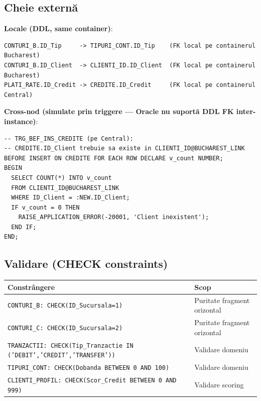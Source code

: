 \documentclass[12pt,a4paper]{article}
\begin{document}
\subsection{Cheie externă}

\textbf{Locale (DDL, same container)}:
\begin{lstlisting}[caption={FK-uri locale}]
CONTURI_B.ID_Tip     -> TIPURI_CONT.ID_Tip    (FK local pe containerul Bucharest)
CONTURI_B.ID_Client  -> CLIENTI_ID.ID_Client  (FK local pe containerul Bucharest)
PLATI_RATE.ID_Credit -> CREDITE.ID_Credit     (FK local pe containerul Central)
\end{lstlisting}

\textbf{Cross-nod (simulate prin triggere — Oracle nu suportă DDL FK inter-instance)}:
\begin{lstlisting}[caption={FK cross-nod implementate prin triggere}]
-- TRG_BEF_INS_CREDITE (pe Central):
-- CREDITE.ID_Client trebuie sa existe in CLIENTI_ID@BUCHAREST_LINK
BEFORE INSERT ON CREDITE FOR EACH ROW DECLARE v_count NUMBER;
BEGIN
  SELECT COUNT(*) INTO v_count
  FROM CLIENTI_ID@BUCHAREST_LINK
  WHERE ID_Client = :NEW.ID_Client;
  IF v_count = 0 THEN
    RAISE_APPLICATION_ERROR(-20001, 'Client inexistent');
  END IF;
END;
\end{lstlisting}

\subsection{Validare (CHECK constraints)}

\begin{center}
\begin{tabular}{ll}
\toprule
\textbf{Constrângere} & \textbf{Scop} \\
\midrule
\texttt{CONTURI\_B: CHECK(ID\_Sucursala=1)} & Puritate fragment orizontal \\
\texttt{CONTURI\_C: CHECK(ID\_Sucursala=2)} & Puritate fragment orizontal \\
\texttt{TRANZACTII: CHECK(Tip\_Tranzactie IN ('DEBIT','CREDIT','TRANSFER'))} & Validare domeniu \\
\texttt{TIPURI\_CONT: CHECK(Dobanda BETWEEN 0 AND 100)} & Validare domeniu \\
\texttt{CLIENTI\_PROFIL: CHECK(Scor\_Credit BETWEEN 0 AND 999)} & Validare scoring \\
\bottomrule
\end{tabular}
\end{center}

\end{document}
